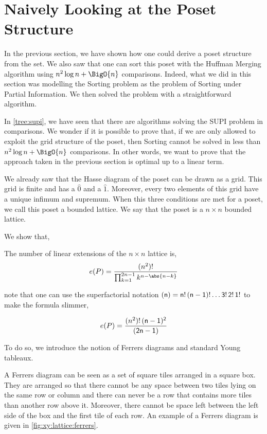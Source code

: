 \section{Naively Looking at the Poset Structure}
\label{tree:xy:grid}

In the previous section, we have shown how one could derive a poset structure
from the \XY set. We also saw that one can sort this \XY poset with the Huffman
Merging algorithm using \(n^2 \log n + \BigO{n}\) comparisons. Indeed, what we
did in this section was modelling the Sorting \XY problem as the problem of
Sorting under Partial Information. We then solved the problem with a
straightforward algorithm.

In \ref{tree:supi}, we have seen that there are algorithms solving the SUPI
problem in  comparisons. We wonder if it is possible to prove
that, if we are only allowed to exploit the grid structure of the \XY poset,
then Sorting \XY cannot be solved in less than \(n^2 \log n + \BigO{n}\)
comparisons. In other words, we want to prove that the approach taken in the
previous section is optimal up to a linear term.

We already saw that the Hasse diagram of the poset \XY can be drawn as a grid.
This grid is finite and has a \(\hat{0}\) and a \(\hat{1}\). Moreover, every
two elements of this grid have a unique infimum and supremum. When this three
conditions are met for a poset, we call this poset a bounded lattice. We say
that the poset \XY is a \( n \times n \) bounded lattice.

We show that,

\begin{theorem}
The number of linear extensions of the \( n \times n \) lattice is,
\begin{displaymath}
e(P) = \frac{(n^2)!}{\prod_{k=1}^{2n-1} k^{n - \abs{n-k}}}
\end{displaymath}
\end{theorem}

note that one can use the superfactorial notation
\( \sf(n) = n!\,(n-1)!\ldots 3!\,2!\,1! \)
to make the formula slimmer,

\begin{displaymath}
e(P) = \frac{(n^2)! \, \sf(n-1)^2}{\sf(2n-1)}
\end{displaymath}

To do so, we introduce the notion of Ferrers diagrams and standard Young tableaux.

A Ferrers diagram can be seen as a set of square tiles arranged in a square
box. They are arranged so that there cannot be any space between two tiles
lying on the same row or column and there can never be a row that contains more
tiles than another row above it. Moreover, there cannot be space left between
the left side of the box and the first tile of each row. An example of a
Ferrers diagram is given in \ref{fig:xy:lattice:ferrers}.

